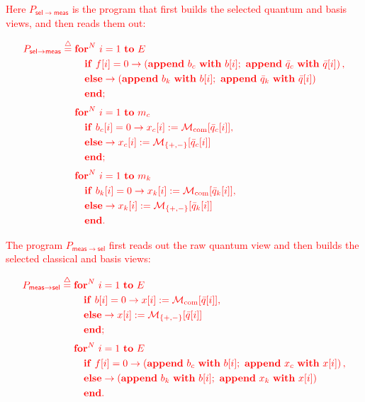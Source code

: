 \documentclass[acmsmall,screen,review,anonymous,nonacm]{acmart}
\theoremstyle{defn_style}
\begin{document}
\textcolor{red}{Here \(P_{\mathsf{sel}\to\mathsf{meas}}\) is the program that first builds the selected quantum and basis views, and then reads them out:}

\[
\textcolor{red}{
\begin{aligned}
P_{\mathsf{sel}\to\mathsf{meas}}
\stackrel{\triangle}{=}\;&
\mathbf{for}^{N}\ i=1\ \mathbf{to}\ E
\\
&\quad
\mathbf{if}\ f[i]=0
\rightarrow
\left(
\mathbf{append}\ b_c\ \mathbf{with}\ b[i];\
\mathbf{append}\ \bar q_c\ \mathbf{with}\ \bar q[i]
\right),
\\
&\quad
\mathbf{else}\rightarrow
\left(
\mathbf{append}\ b_k\ \mathbf{with}\ b[i];\
\mathbf{append}\ \bar q_k\ \mathbf{with}\ \bar q[i]
\right)
\\
&\quad
\mathbf{end};
\\[0.5ex]
&
\mathbf{for}^{N}\ i=1\ \mathbf{to}\ m_c
\\
&\quad
\mathbf{if}\ b_c[i]=0
\rightarrow
x_c[i]:=\mathcal M_{\mathrm{com}}[\bar q_c[i]],
\\
&\quad
\mathbf{else}\rightarrow
x_c[i]:=\mathcal M_{\{+,-\}}[\bar q_c[i]]
\\
&\quad
\mathbf{end};
\\[0.5ex]
&
\mathbf{for}^{N}\ i=1\ \mathbf{to}\ m_k
\\
&\quad
\mathbf{if}\ b_k[i]=0
\rightarrow
x_k[i]:=\mathcal M_{\mathrm{com}}[\bar q_k[i]],
\\
&\quad
\mathbf{else}\rightarrow
x_k[i]:=\mathcal M_{\{+,-\}}[\bar q_k[i]]
\\
&\quad
\mathbf{end}.
\end{aligned}
}
\]

\textcolor{red}{The program \(P_{\mathsf{meas}\to\mathsf{sel}}\) first reads out the raw
quantum view and then builds the selected classical and basis views:}

\[
\textcolor{red}{
\begin{aligned}
P_{\mathsf{meas}\to\mathsf{sel}}
\stackrel{\triangle}{=}\;&
\mathbf{for}^{N}\ i=1\ \mathbf{to}\ E
\\
&\quad
\mathbf{if}\ b[i]=0
\rightarrow
x[i]:=\mathcal M_{\mathrm{com}}[\bar q[i]],
\\
&\quad
\mathbf{else}\rightarrow
x[i]:=\mathcal M_{\{+,-\}}[\bar q[i]]
\\
&\quad
\mathbf{end};
\\[0.5ex]
&
\mathbf{for}^{N}\ i=1\ \mathbf{to}\ E
\\
&\quad
\mathbf{if}\ f[i]=0
\rightarrow
\left(
\mathbf{append}\ b_c\ \mathbf{with}\ b[i];\
\mathbf{append}\ x_c\ \mathbf{with}\ x[i]
\right),
\\
&\quad
\mathbf{else}\rightarrow
\left(
\mathbf{append}\ b_k\ \mathbf{with}\ b[i];\
\mathbf{append}\ x_k\ \mathbf{with}\ x[i]
\right)
\\
&\quad
\mathbf{end}.
\end{aligned}
}
\]
\end{document}
